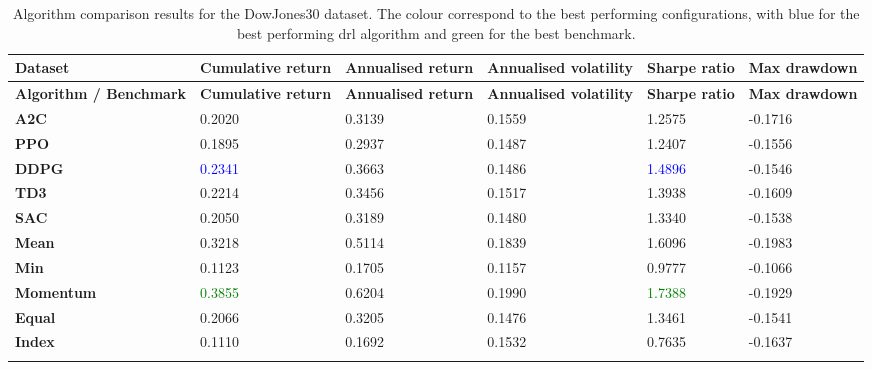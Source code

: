 \begin{longtable}{|p{2cm}|p{2.1cm}|p{2.1cm}|p{2.1cm}|p{1.5cm}|p{2cm}|}
    \hline
    \textbf{Dataset} & \textbf{Cumulative return} & \textbf{Annualised return} & \textbf{Annualised volatility} & \textbf{Sharpe ratio} & \textbf{Max drawdown}  \\ \midrule
    \endfirsthead

    \hline
    \textbf{Algorithm / Benchmark} & \textbf{Cumulative return} & \textbf{Annualised return} & \textbf{Annualised volatility} & \textbf{Sharpe ratio} & \textbf{Max drawdown}  \\ \midrule
    \endhead

    \endfoot
    \hline

    \textbf{A2C} & 0.2020 & 0.3139 & 0.1559 & 1.2575 & -0.1716 \\ \hline
    \textbf{PPO} & 0.1895 & 0.2937 & 0.1487 & 1.2407 & -0.1556 \\ \hline
    \textbf{DDPG} & \textcolor{blue}{0.2341} & 0.3663 & 0.1486 & \textcolor{blue}{1.4896} & -0.1546 \\ \hline
    \textbf{TD3} & 0.2214 & 0.3456 & 0.1517 & 1.3938 & -0.1609 \\ \hline
    \textbf{SAC} & 0.2050 & 0.3189 & 0.1480 & 1.3340 & -0.1538 \\ \hline
    \textbf{Mean} & 0.3218 & 0.5114 & 0.1839 & 1.6096 & -0.1983 \\ \hline
    \textbf{Min} & 0.1123 & 0.1705 & 0.1157 & 0.9777 & -0.1066 \\ \hline
    \textbf{Momentum} & \textcolor{green}{0.3855} & 0.6204 & 0.1990 & \textcolor{green}{1.7388} & -0.1929 \\ \hline
    \textbf{Equal} & 0.2066 & 0.3205 & 0.1476 & 1.3461 & -0.1541 \\ \hline
    \textbf{Index} & 0.1110 & 0.1692 & 0.1532 & 0.7635 & -0.1637 \\ \hline

    \caption{Algorithm comparison results for the DowJones30 dataset. The colour correspond to the best performing configurations, with blue for the best performing \acrshort{drl} algorithm and green for the best benchmark.}
    \label{tab:experiment_algorithms_dow30}
\end{longtable}